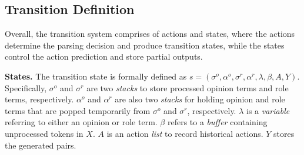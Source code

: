 \documentclass[letterpaper]{article} \usepackage{aaai22}  \usepackage{times}  \usepackage{helvet}  \usepackage{courier}  \usepackage[hyphens]{url}  \usepackage{graphicx} \urlstyle{rm} \def\UrlFont{\rm}  \usepackage{natbib}  \usepackage{caption} \DeclareCaptionStyle{ruled}{labelfont=normalfont,labelsep=colon,strut=off} \frenchspacing  \setlength{\pdfpagewidth}{8.5in}  \setlength{\pdfpageheight}{11in}  \usepackage{algorithm}
\begin{document}
\subsection{Transition Definition}

Overall, the transition system comprises of actions and states, where the actions determine the parsing decision and produce transition states, while the states control the action prediction and store partial outputs.




\noindent\textbf{States.}
The transition state is formally defined as  $s=(\sigma^{o},\alpha^{o},\sigma^{r},\alpha^{r}, \lambda, \beta, A, Y)$.
Specifically,  
$\sigma^{o}$ and $\sigma^{r}$ are two \emph{stacks} to store processed opinion terms and role terms, respectively.
$\alpha^{o}$ and $\alpha^{r}$ are also two \emph{stacks} for holding opinion and role terms that are popped temporarily from $\sigma^{o}$ and $\sigma^{r}$, respectively.
$\lambda$ is a \emph{variable} referring to either an opinion or role term.
$\beta$ refers to a \emph{buffer} containing unprocessed tokens in $X$.
$A$ is an action \emph{list} to record historical actions.
$Y$ stores the generated pairs.
\end{document}
